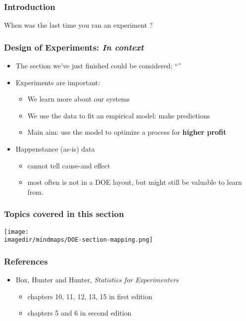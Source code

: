 

\begin{frame}\frametitle{Introduction}
	\begin{exampleblock}{}
		{\Huge When was the last time you ran an experiment ?}
	\end{exampleblock}
\end{frame}

\begin{frame}\frametitle{Design of Experiments: \emph{In context}}
	\begin{itemize}
		\item	The section we've just finished could be considered: ``{\color{myOrange}{Empirical modelling of systems using a least squares model}}''
		
		\vspace{12pt}
		\item	Experiments are important:
		\begin{itemize}
			\item	We learn more about our systems
			\item	We use the data to fit an empirical model: {\color{red}make predictions}
			\item	Main aim: use the model to optimize a process for \textbf{higher profit}
		\end{itemize}
		
		\vspace{12pt}
		\item	Happenstance (as-is) data 
		\begin{itemize}
			\item	cannot tell cause-and effect
			\item	most often is not in a DOE layout, but might still be valuable to learn from.
		\end{itemize}
	\end{itemize}
\end{frame}

\begin{frame}\frametitle{Topics covered in this section}
	\begin{center}
		\texttt{[image: \\imagedir/mindmaps/DOE-section-mapping.png]}
	\end{center}
\end{frame}

\begin{frame}\frametitle{References}
	\begin{itemize}
		\item	Box, Hunter and Hunter, \emph{Statistics for Experimenters}
		\begin{itemize}
			\item	chapters 10, 11, 12, 13, 15 in first edition
			\item	chapters 5 and 6 in second edition
		\end{itemize}
	\end{itemize}
\end{frame}

